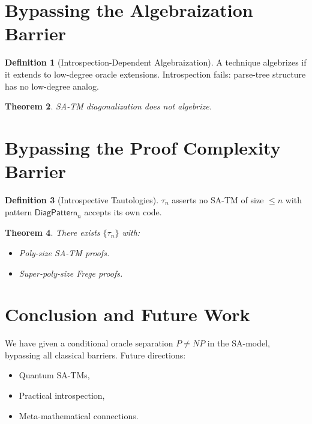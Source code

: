\documentclass[12pt]{article}
\newcommand{\DiagPattern}{\mathsf{DiagPattern}}
\theoremstyle{definition}
\newtheorem{definition}{Definition}[section]
\theoremstyle{plain}
\newtheorem{theorem}[definition]{Theorem}
\begin{document}
\section{Bypassing the Algebraization Barrier}

\begin{definition}[Introspection-Dependent Algebraization]
A technique algebrizes if it extends to low-degree oracle extensions.
Introspection fails: parse-tree structure has no low-degree analog.
\end{definition}

\begin{theorem}
SA-TM diagonalization does not algebrize.
\end{theorem}

\section{Bypassing the Proof Complexity Barrier}

\begin{definition}[Introspective Tautologies]
\(\tau_n\) asserts no SA-TM of size \(\le n\) with pattern \(\DiagPattern_n\)
accepts its own code.
\end{definition}

\begin{theorem}
There exists \(\{\tau_n\}\) with:
\begin{itemize}
  \item Poly-size SA-TM proofs.
  \item Super-poly-size Frege proofs.
\end{itemize}
\end{theorem}

\section{Conclusion and Future Work}

We have given a conditional oracle separation \(P\neq NP\) in the SA-model,
bypassing all classical barriers. Future directions:
\begin{itemize}
  \item Quantum SA-TMs,
  \item Practical introspection,
  \item Meta-mathematical connections.
\end{itemize}



\end{document}
